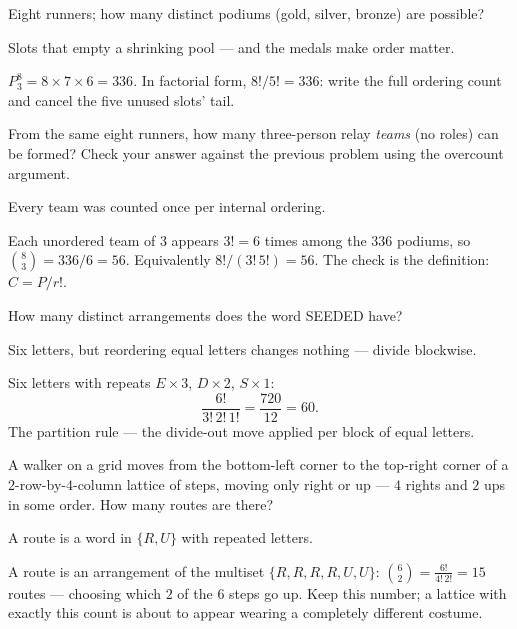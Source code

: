 \begin{problem}
Eight runners; how many distinct podiums (gold, silver, bronze) are
possible?
\begin{hint}
Slots that empty a shrinking pool — and the medals make order matter.
\end{hint}
\begin{solution}
$P^8_3 = 8 \times 7 \times 6 = 336$. In factorial form,
$8!/5! = 336$: write the full ordering count and cancel the five
unused slots' tail.
\end{solution}
\end{problem}

\begin{problem}
From the same eight runners, how many three-person relay \emph{teams}
(no roles) can be formed? Check your answer against the previous
problem using the overcount argument.
\begin{hint}
Every team was counted once per internal ordering.
\end{hint}
\begin{solution}
Each unordered team of $3$ appears $3! = 6$ times among the $336$
podiums, so
$\binom{8}{3} = 336 / 6 = 56$. Equivalently
$8!/(3!\,5!) = 56$. The check is the definition: $C = P / r!$.
\end{solution}
\end{problem}

\begin{problem}
How many distinct arrangements does the word SEEDED have?
\begin{hint}
Six letters, but reordering equal letters changes nothing — divide
blockwise.
\end{hint}
\begin{solution}
Six letters with repeats $E \times 3$, $D \times 2$, $S \times 1$:
\[
  \frac{6!}{3!\,2!\,1!} = \frac{720}{12} = 60 .
\]
The partition rule — the divide-out move applied per block of equal
letters.
\end{solution}
\end{problem}

\begin{problem}[stretch]
A walker on a grid moves from the bottom-left corner to the top-right
corner of a $2$-row-by-$4$-column lattice of steps, moving only right or
up — $4$ rights and $2$ ups in some order. How many routes are there?
\begin{hint}
A route is a word in $\{R, U\}$ with repeated letters.
\end{hint}
\begin{solution}
A route is an arrangement of the multiset $\{R,R,R,R,U,U\}$:
$\binom{6}{2} = \frac{6!}{4!\,2!} = 15$ routes — choosing which $2$ of
the $6$ steps go up. Keep this number; a lattice with exactly this count
is about to appear wearing a completely different costume.
\end{solution}
\end{problem}
